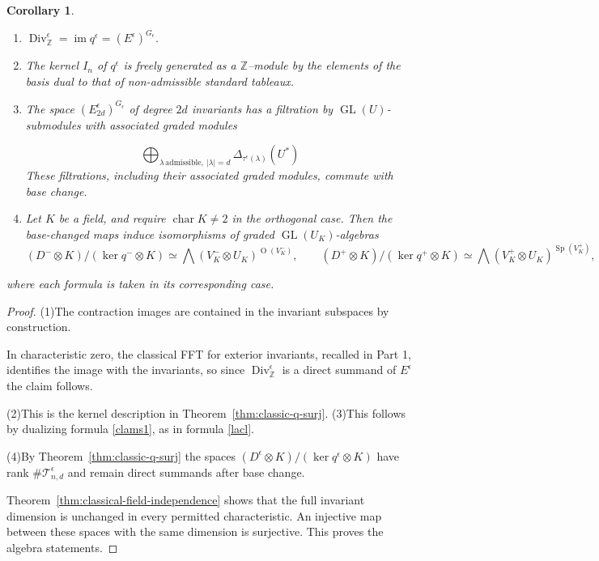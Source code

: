 \documentclass[10pt]{amsart}
\newtheorem{corollary}[theorem]{Corollary}
\theoremstyle{definition}
\theoremstyle{remark}
\newcommand{\Z}{\mathbb Z}
\newcommand{\GL}{\operatorname{GL}}
\newcommand{\Sp}{\operatorname{Sp}}
\newcommand{\OO}{\operatorname{O}}
\newcommand{\Div}{\operatorname{Div}}
\begin{document}
\begin{corollary}
 
\label{cor:classical-weyl}\strut\begin{enumerate}\item $\Div^\epsilon_{\mathbb Z } =\operatorname{im}q ^\epsilon=(E ^\epsilon)^{G_\epsilon}.$
\item The kernel $I_n$ of $q ^\epsilon$ is freely generated as a $\Z$--module by the elements of
the  basis dual to that of non-admissible standard tableaux.
\item 
The space $(E_{2d}^\epsilon)^{G_\epsilon}$ of degree $2d$  invariants  has a filtration by
$\GL(U)$-submodules with associated graded  modules

$$\bigoplus_{\lambda\,\mathrm{admissible},\ |\lambda|=d}\Delta_{\tau^\epsilon(\lambda)}(U^*)$$
These filtrations, including their associated graded modules, commute with base change.
\item Let $K$ be a  field, and require $\operatorname{char}K\ne2$
in the orthogonal case. Then the base-changed maps induce
isomorphisms of graded $\GL(U_K)$-algebras
\[
 (D^-\otimes K)/(\ker q^-\otimes K)\simeq
 \bigwedge(V^-_K\otimes U_K)^{\OO(V^-_K)},
 \qquad
 (D^+\otimes K)/(\ker q^+\otimes K)\simeq
 \bigwedge(V^+_K\otimes U_K)^{\Sp(V^+_K)},
\]
\end{enumerate}
where each formula is taken in its corresponding case.\smallskip


\end{corollary}
\begin{proof} 

(1)\quad The contraction images are contained in the invariant subspaces by
construction. 

In characteristic zero, the classical FFT for exterior invariants, recalled in Part 1, identifies the image       
with the invariants, so since $\Div^\epsilon_{\mathbb Z }$ is a direct summand of  $E^\epsilon$ the claim follows.\smallskip

(2)\quad This is the kernel description in Theorem~\ref{thm:classic-q-surj}. (3)\quad This follows by dualizing formula \eqref{clams1}, as in formula \eqref{lacl}.


\smallskip

(4)\quad By Theorem~\ref{thm:classic-q-surj} the spaces $ (D^\epsilon\otimes K)/(\ker q^\epsilon\otimes K)$  have rank
$\#\mathcal T_{n,d}^\epsilon$ and remain direct summands after base
change. 

 Theorem~\ref{thm:classical-field-independence}
shows that the full invariant dimension is unchanged in every
permitted characteristic. An injective map between these spaces with
the same dimension is surjective. This proves the algebra statements. 


\end{proof}
 
\end{document}
